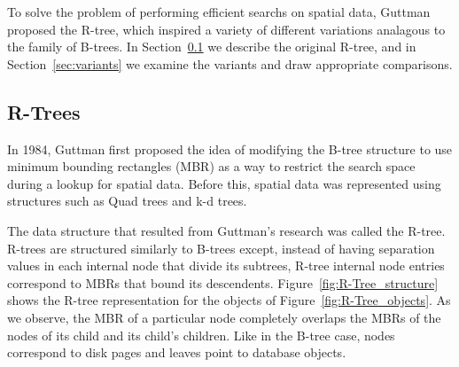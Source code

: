To solve the problem of performing efficient searchs on spatial data, 
Guttman proposed the R-tree, which inspired a variety of different 
variations analagous to the family of B-trees. In Section~\ref{sec:rtrees}
we describe the original R-tree, and in Section~\ref{sec:variants}
we examine the variants and draw appropriate comparisons.

\subsection{R-Trees}
\label{sec:rtrees}
In 1984, Guttman first proposed the idea of modifying the B-tree structure to
use minimum bounding rectangles (MBR) as a way to restrict the search space 
during a lookup for spatial data\cite{guttman84}. Before this, spatial data was
represented using structures such as Quad trees\cite{} and k-d trees\cite{}.

The data structure that resulted from Guttman's research
was called the R-tree. R-trees are structured similarly to B-trees except, instead 
of having separation values in each internal node that divide its subtrees, R-tree 
internal node entries correspond to MBRs that bound its descendents. 
Figure~\ref{fig:R-Tree_structure} shows the R-tree representation for the objects 
of Figure~\ref{fig:R-Tree_objects}. As we observe, the MBR of a particular node 
completely overlaps the MBRs of the nodes of its child and its child's children. 
Like in the B-tree case, nodes correspond to disk pages and leaves point to 
database objects.

